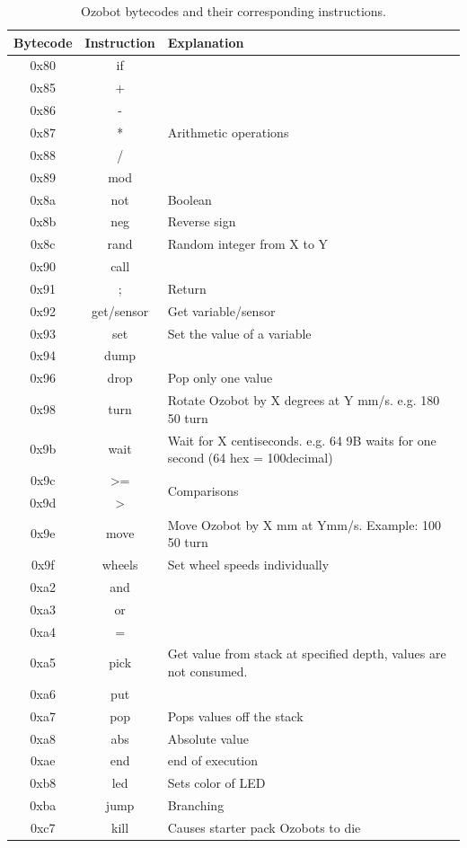 \documentclass[oneside,%
                    author={Malak Hajji},
                    degree={BSc},
                    title={Designing An Accessible Ozobot Programming Platform for Students},
                  subtitle={With Mixed Visual Abilities}]{dissertation}
\begin{document}
\begin{table}
\centering
\begin{tabular}{|c|c|l|}
\hline
\textbf{Bytecode}  &\textbf{Instruction}  & \textbf{Explanation}  \\ \hline
0x80 &if & \\ \hline 
0x85 &+  &\multirow{5}{*}{Arithmetic operations}\\ 
0x86 &- & \\ 
0x87 &*  &    \\ 
0x88 &/   &   \\
0x89 &mod  &  \\ \hline 
0x8a &not   &Boolean \\ \hline 
0x8b &neg &Reverse sign\\ \hline 
0x8c &rand &Random integer from X to Y \\ \hline 
0x90 &call &\\ \hline 
0x91 &; &Return\\ \hline 
0x92 &get/sensor &Get variable/sensor\\ \hline 
0x93 &set &Set the value of a variable\\ \hline 
0x94 &dump &\\ \hline 
0x96 &drop &Pop only one value\\ \hline 
0x98 &turn &Rotate Ozobot by X degrees at Y mm/s. e.g. 180 50 turn\\ \hline 
0x9b &wait &Wait for X centiseconds. e.g. 64 9B waits for one second (64 hex = 100decimal)\\ \hline 
0x9c &\textgreater = &\multirow{2}{*}{Comparisons}\\ 
0x9d &\textgreater &\\ \hline 
0x9e &move &Move Ozobot by X mm at Ymm/s. Example: 100 50 turn\\ \hline  
0x9f &wheels &Set wheel speeds individually\\ \hline 
0xa2 &and &\\ \hline 
0xa3 &or &\\ \hline 
0xa4 &= &\\ \hline 
0xa5 &pick &Get value from stack at specified depth, values are not consumed.
\\ \hline 
0xa6 &put &\\ \hline 
0xa7 &pop &Pops values off the stack\\ \hline 
0xa8 &abs &Absolute value\\ \hline 
0xae &end  &end of execution\\ \hline 
0xb8 &led  &Sets color of LED\\ \hline 
0xba &jump  &Branching \\ \hline 
0xc7 &kill &Causes starter pack Ozobots to die \\ \hline 

\hline
\end{tabular}
\caption{Ozobot bytecodes and their corresponding instructions\cite{ashley}.}
\label{tab-bytecode}
\end{table}
\end{document}
